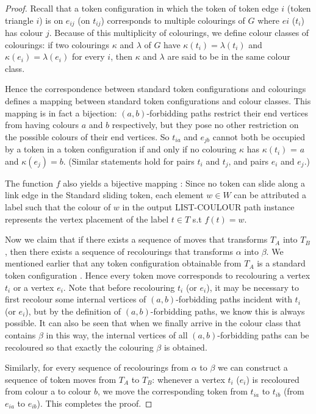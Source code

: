 \begin{proof} \cite{bonsma}
Recall that a token configuration in which the token of token edge $i$ (token triangle $i$) is on $e_{ij}$ (on $t_ {ij}$) corresponds
to multiple colourings of $G$ where $ei$ ($t_i$) has colour $j$. Because of this multiplicity of colourings, we define colour classes of
colourings: if two colourings $\kappa$ and $\lambda$ of $G$ have $\kappa(t_i) = \lambda(t_i)$ and $\kappa(e_i) = \lambda(e_i)$ for every $i$,
then $\kappa$ and $\lambda$ are said to be in the same colour class.

Hence the correspondence between standard token configurations and colourings defines a mapping between standard
token configurations and colour classes. This mapping is in fact a bijection: $(a, b)$-forbidding paths restrict their end vertices
from having colours $a$ and $b$ respectively, but they pose no other restriction on the possible colours of their end vertices.
So $t_{ia}$ and $e_{jb}$ cannot both be occupied by a token in a token configuration if and only if no colouring $\kappa$ has $\kappa(t_i)$ = $a$
and $\kappa(e_j) = b$. (Similar statements hold for pairs $t_i$ and $t_j$, and pairs $e_i$ and $e_j$.)

The function $f$ also yields a bijective mapping : Since no token can slide along a link edge in the Standard sliding token,
each element $w \in W$ can be attributed a label such that the colour of $w$ in the output LIST-COULOUR path instance represents
the vertex placement of the label $t \in T$ s.t $f(t) = w$.

Now we claim that if there exists a sequence of moves that transforms $T_A$ into $T_B$, then there exists a sequence of
recolourings that transforms $\alpha$ into $\beta$. We mentioned earlier that any token configuration obtainable from $T_A$ is a standard
token configuration \cite{bonsma}. Hence every token move corresponds to recolouring a vertex $t_i$ or a vertex $e_i$. Note that before
recolouring $t_i$ (or $e_i$), it may be necessary to first recolour some internal vertices of $(a, b)$-forbidding paths incident with
$t_i$ (or $e_i$), but by the definition of $(a, b)$-forbidding paths, we know this is always possible. It can also be seen that when
we finally arrive in the colour class that contains $\beta$ in this way, the internal vertices of all $(a, b)$-forbidding paths can be
recoloured so that exactly the colouring $\beta$ is obtained.

Similarly, for every sequence of recolourings from $\alpha$ to $\beta$ we can construct a sequence of token moves from $T_A$ to $T_B$:
whenever a vertex $t_i$ ($e_i$) is recoloured from colour a to colour $b$, we move the corresponding token from $t_{ia}$ to $t_{ib}$
(from $e_ {ia}$ to $e_{ib}$). This completes the proof.
\end{proof}


